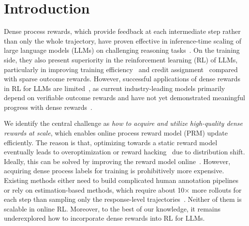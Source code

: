 
\section{Introduction}
Dense process rewards, which provide feedback at each intermediate step rather than only the whole trajectory, have proven effective in inference-time scaling of large language models (LLMs) on challenging reasoning tasks~\citep{uesato2022solving,Lightman2023LetsVS,Wang2023MathShepherdVA,yuan2024freeprocessrewardsprocess}.
On the training side, they also present superiority in the reinforcement learning (RL) of LLMs, particularly in improving training efficiency~\citep{sutton2018reinforcement} and credit assignment~\citep{leike2018scalable} compared with sparse outcome rewards.
However, successful applications of dense rewards in RL for LLMs are limited~\citep{setlur2024rewarding}, as current industry-leading models primarily depend on verifiable outcome rewards and have not yet demonstrated meaningful progress with dense rewards~\citep{deepseekai2025deepseekr1incentivizingreasoningcapability,team2025kimi}.

We identify the central challenge as \textit{how to acquire and utilize high-quality dense rewards at scale}, which enables online process reward model (PRM) update efficiently.
The reason is that, optimizing towards a static reward model eventually leads to overoptimization or reward hacking~\citep{Gao2022ScalingLF} due to distribution shift. 
Ideally, this can be solved by improving the reward model online~\citep{leike2018scalable}. However, acquiring dense process labels for training is prohibitively more expensive. Existing methods either need to build complicated human annotation pipelines~\citep{Lightman2023LetsVS} or rely on estimation-based methods, which require about 10$\times$ more rollouts for each step than sampling only the response-level trajectories~\citep{Wang2023MathShepherdVA,kazemnejad2024vineppo}.
Neither of them is scalable in online RL. 
Moreover, to the best of our knowledge, it remains underexplored how to incorporate dense rewards into RL for LLMs. %

